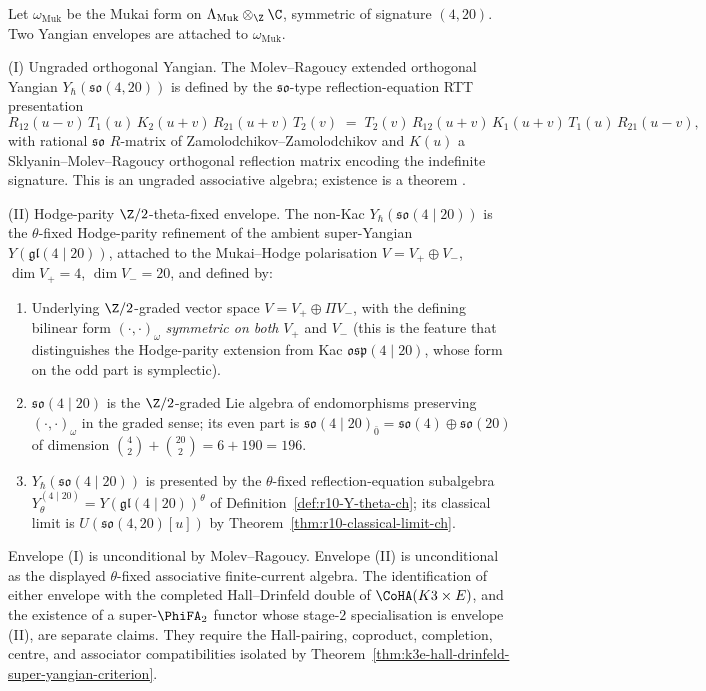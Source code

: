 \begin{theorem}
\label{conj:osp-yangian-mukai}
Let $\omega_{\mathrm{Muk}}$ be the Mukai form on
$\Lambda_{\mathrm{Muk}} \otimes_\Z \C$, symmetric of signature
$(4, 20)$. Two Yangian envelopes are attached to $\omega_{\mathrm{Muk}}$.

\textup{(I) Ungraded orthogonal Yangian.} The Molev--Ragoucy extended
orthogonal Yangian $Y_\hbar(\mathfrak{so}(4, 20))$ is defined by the
$\mathfrak{so}$-type reflection-equation RTT presentation
\[
 R_{12}(u - v)\, T_1(u)\, K_2(u + v)\, R_{21}(u + v)\, T_2(v)
 \;=\;
 T_2(v)\, R_{12}(u + v)\, K_1(u + v)\, T_1(u)\, R_{21}(u - v),
\]
with rational $\mathfrak{so}$ $R$-matrix of Zamolodchikov--Zamolodchikov
and $K(u)$ a Sklyanin--Molev--Ragoucy orthogonal reflection matrix
encoding the indefinite signature. This is an ungraded associative
algebra; existence is a theorem \cite{MolevRagoucy2008}.

\textup{(II) Hodge-parity $\Z/2$-theta-fixed envelope.} The
non-Kac $Y_\hbar(\mathfrak{so}(4 \mid 20))$ is the
$\theta$-fixed Hodge-parity refinement of the ambient super-Yangian
$Y(\mathfrak{gl}(4 \mid 20))$, attached to the Mukai--Hodge
polarisation $V = V_+ \oplus V_-$, $\dim V_+ = 4$,
$\dim V_- = 20$, and defined by:
\begin{enumerate}[label=\textup{(\roman*)}]
\item Underlying $\Z/2$-graded vector space $V = V_+ \oplus \Pi V_-$,
 with the defining bilinear form $(\cdot, \cdot)_\omega$ \emph{symmetric
 on both} $V_+$ and $V_-$ (this is the feature that distinguishes the
 Hodge-parity extension from Kac $\mathfrak{osp}(4 \mid 20)$, whose
 form on the odd part is symplectic).
\item $\mathfrak{so}(4 \mid 20)$ is the $\Z/2$-graded Lie algebra of
 endomorphisms preserving $(\cdot, \cdot)_\omega$ in the graded sense;
 its even part is $\mathfrak{so}(4 \mid 20)_{\bar 0} = \mathfrak{so}(4)
 \oplus \mathfrak{so}(20)$ of dimension
 $\binom{4}{2} + \binom{20}{2} = 6 + 190 = 196$.
\item $Y_\hbar(\mathfrak{so}(4 \mid 20))$ is presented by the
 $\theta$-fixed reflection-equation subalgebra
 $Y_\theta^{(4 \mid 20)} = Y(\mathfrak{gl}(4 \mid 20))^\theta$ of
 Definition~\ref{def:r10-Y-theta-ch}; its classical limit is
 $U(\mathfrak{so}(4,20)[u])$ by
 Theorem~\ref{thm:r10-classical-limit-ch}.
\end{enumerate}
Envelope \textup{(I)} is unconditional by Molev--Ragoucy. Envelope
\textup{(II)} is unconditional as the displayed $\theta$-fixed
associative finite-current algebra. The identification of either
envelope with the completed Hall--Drinfeld double of
$\CoHA(K3\times E)$, and the existence of a super-$\PhiFA_2$ functor
whose stage-$2$ specialisation is envelope \textup{(II)}, are separate
claims. They require the Hall-pairing, coproduct,
completion, centre, and associator compatibilities isolated by
Theorem~\ref{thm:k3e-hall-drinfeld-super-yangian-criterion}.
\end{theorem}

